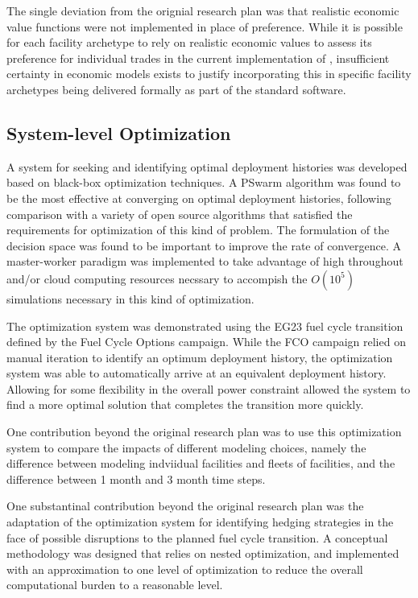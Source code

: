 The single deviation from the orignial research plan was that realistic
economic value functions were not implemented in place of preference.  While
it is possible for each facility archetype to rely on realistic economic
values to assess its preference for individual trades in the current
implementation of \Cyclus{}, insufficient certainty in economic models exists
to justify incorporating this in specific facility archetypes being delivered
formally as part of the standard software.

\subsection{System-level Optimization}

A system for seeking and identifying optimal deployment histories was
developed based on black-box optimization techniques.  A PSwarm algorithm was
found to be the most effective at converging on optimal deployment histories,
following comparison with a variety of open source algorithms that satisfied
the requirements for optimization of this kind of problem.  The formulation of
the decision space was found to be important to improve the rate of
convergence.  A master-worker paradigm was implemented to take advantage of
high throughout and/or cloud computing resources necssary to accompish the
$O(10^5)$ \Cyclus{} simulations necessary in this kind of optimization.

The optimization system was demonstrated using the EG23 fuel cycle transition
defined by the Fuel Cycle Options campaign.  While the FCO campaign relied on
manual iteration to identify an optimum deployment history, the optimization
system was able to automatically arrive at an equivalent deployment history.
Allowing for some flexibility in the overall power constraint allowed the
system to find a more optimal solution that completes the transition more
quickly.

One contribution beyond the original research plan was to use this
optimization system to compare the impacts of different modeling choices,
namely the difference between modeling indviidual facilities and fleets of
facilities, and the difference between 1 month and 3 month time
steps.

One substantinal contribution beyond the original research plan was the
adaptation of the optimization system for identifying hedging strategies in
the face of possible disruptions to the planned fuel cycle transition.  A
conceptual methodology was designed that relies on nested optimization, and
implemented with an approximation to one level of optimization to reduce the
overall computational burden to a reasonable level.






